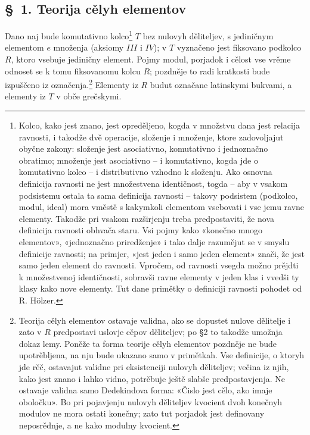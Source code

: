 \documentclass[11pt]{article}
\begin{document}
\setcounter{footnote}{5}

\subsection*{\S~1. Teorija cělyh elementov}

Dano naj bude komutativno kolco\footnote{Kolco, kako jest znano, jest opreděljeno, kogda v množstvu dana jest relacija ravnosti, i takodže dvě operacije, složenje i množenje, ktore zadovoljajut obyčne zakony: složenje jest asociativno, komutativno i jednoznačno obratimo; množenje jest asociativno -- i komutativno, kogda jde o komutativno kolco -- i distributivno vzhodno k složenju. Ako osnovna definicija ravnosti ne jest množestvena identičnost, togda -- aby v vsakom podsistemu ostala ta sama definicija ravnosti -- takovy podsistem (podkolco, modul, ideal) mora vměstě s kakymkoli elementom vsebovati i vse jemu ravne elementy. Takodže pri vsakom razširjenju treba predpostaviti, že nova definicija ravnosti obhvača staru. Vsi pojmy kako «konečno mnogo elementov», «jednoznačno priredženje» i tako dalje razumějut se v smyslu definicije ravnosti; na primjer, «jest jeden i samo jeden element» znači, že jest samo jeden element do ravnosti. Vpročem, od ravnosti vsegda možno prějdti k množestvenoj identičnosti, sobravši ravne elementy v jeden klas i vvedši ty klasy kako nove elementy. Tut dane primětky o definiciji ravnosti pohodet od R. Hölzer.} $T$ bez nulovyh děliteljev, s jediničnym elementom $e$ množenja (aksiomy $III$ i $IV$); v $T$ vyznačeno jest fiksovano podkolco $R$, ktoro vsebuje jediničny element. Pojmy modul, porjadok i cělost vse vrěme odnoset se k tomu fiksovanomu kolcu $R$; pozdněje to radi kratkosti bude izpuščeno iz označenja.\footnote{Teorija cělyh elementov ostavaje validna, ako se dopustet nulove dělitelje i zato v $R$ predpostavi uslovje cěpov děliteljev; po §2 to takodže umožnja dokaz lemy. Poněže ta forma teorije cělyh elementov pozdněje ne bude upotrěbljena, na nju bude ukazano samo v primětkah. Vse definicije, o ktoryh jde rěč, ostavajut validne pri eksistenciji nulovyh děliteljev; večina iz njih, kako jest znano i lahko vidno, potrěbuje ještě slabše predpostavjenja. Ne ostavaje validna samo Dedekindova forma: «Čislo jest cělo, ako imaje oboločku». Bo pri pojavjenju nulovyh děliteljev kvocient dvoh konečnyh modulov ne mora ostati konečny; zato tut porjadok jest definovany neposrědnje, a ne kako modulny kvocient.} Elementy iz $R$ budut označane latinskymi bukvami, a elementy iz $T$ v obče grečskymi.
\end{document}
